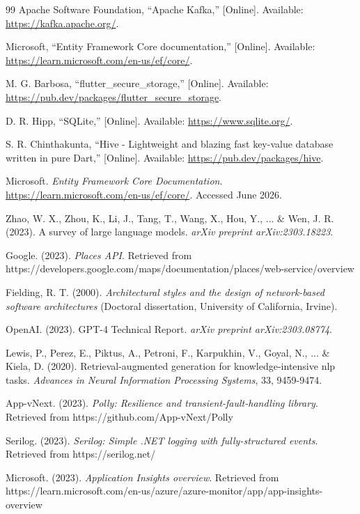\begin{thebibliography}{99}
Apache Software Foundation, ``Apache Kafka,'' [Online]. Available: \url{https://kafka.apache.org/}.

Microsoft, ``Entity Framework Core documentation,'' [Online]. Available: \url{https://learn.microsoft.com/en-us/ef/core/}.

M. G. Barbosa, ``flutter\_secure\_storage,'' [Online]. Available: \url{https://pub.dev/packages/flutter_secure_storage}.

D. R. Hipp, ``SQLite,'' [Online]. Available: \url{https://www.sqlite.org/}.

S. R. Chinthakunta, ``Hive - Lightweight and blazing fast key-value database written in pure Dart,'' [Online]. Available: \url{https://pub.dev/packages/hive}.

Microsoft. \textit{Entity Framework Core Documentation}. \url{https://learn.microsoft.com/en-us/ef/core/}. Accessed June 2026.

Zhao, W. X., Zhou, K., Li, J., Tang, T., Wang, X., Hou, Y., ... \& Wen, J. R. (2023). A survey of large language models. \textit{arXiv preprint arXiv:2303.18223}.

Google. (2023). \textit{Places API}. Retrieved from https://developers.google.com/maps/documentation/places/web-service/overview

Fielding, R. T. (2000). \textit{Architectural styles and the design of network-based software architectures} (Doctoral dissertation, University of California, Irvine).

OpenAI. (2023). GPT-4 Technical Report. \textit{arXiv preprint arXiv:2303.08774}.

Lewis, P., Perez, E., Piktus, A., Petroni, F., Karpukhin, V., Goyal, N., ... \& Kiela, D. (2020). Retrieval-augmented generation for knowledge-intensive nlp tasks. \textit{Advances in Neural Information Processing Systems}, 33, 9459-9474.

App-vNext. (2023). \textit{Polly: Resilience and transient-fault-handling library}. Retrieved from https://github.com/App-vNext/Polly

Serilog. (2023). \textit{Serilog: Simple .NET logging with fully-structured events}. Retrieved from https://serilog.net/

Microsoft. (2023). \textit{Application Insights overview}. Retrieved from https://learn.microsoft.com/en-us/azure/azure-monitor/app/app-insights-overview


\end{thebibliography}
